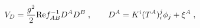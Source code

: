\begin{equation}
\label{eq:Dterm}
V_D = \frac{g^2}2 {\rm Re} f_{AB}^{-1} D^A D^B \;,\qquad D^A = K^i
(T^A)_i^j \phi_j + \xi^A \;, 
\end{equation}

